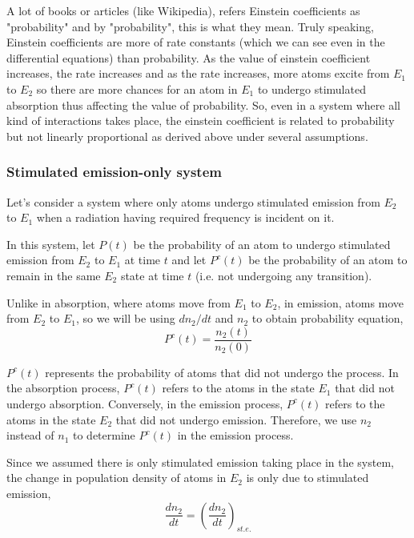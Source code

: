 \documentclass[12pt]{article}
\begin{document}
A lot of books or articles (like Wikipedia), refers Einstein coefficients as "probability" and by "probability", this is what they mean. Truly speaking, Einstein coefficients are more of rate constants (which we can see even in the differential equations) than probability. As the value of einstein coefficient increases, the rate increases and as the rate increases, more atoms excite from $E_{1}$ to $E_{2}$ so there are more chances for an atom in $E_{1}$ to undergo stimulated absorption thus affecting the value of probability. So, even in a system where all kind of interactions takes place, the einstein coefficient is related to probability but not linearly proportional as derived above under several assumptions.

\subsubsection{Stimulated emission-only system}

Let's consider a system where only atoms undergo stimulated emission from $E_{2}$ to $E_{1}$ when a radiation having required frequency is incident on it. \vspace{.2cm}

In this system, let $P(t)$ be the probability of an atom to undergo stimulated emission from $E_{2}$ to $E_{1}$ at time $t$ and let $P^c(t)$ be the probability of an atom to remain in the same $E_{2}$ state at time $t$ (i.e. not undergoing any transition). \vspace{.2cm}

Unlike in absorption, where atoms move from $E_{1}$ to $E_{2}$, in emission, atoms move from $E_{2}$ to $E_{1}$, so we will be using $dn_{2}/dt$ and $n_{2}$ to obtain probability equation,
\begin{equation*}
    P^c(t) = \frac{n_{2}(t)}{n_{2}(0)}
\end{equation*}

$P^c(t)$ represents the probability of atoms that did not undergo the process. In the absorption process, $P^c(t)$ refers to the atoms in the state $E_1$ that did not undergo absorption. Conversely, in the emission process, $P^c(t)$ refers to the atoms in the state $E_2$ that did not undergo emission. Therefore, we use $n_2$ instead of $n_1$ to determine $P^c(t)$ in the emission process. \vspace{.2cm}

Since we assumed there is only stimulated emission taking place in the system, the change in population density of atoms in $E_{2}$ is only due to stimulated emission,
\begin{equation*}
    \frac{dn_{2}}{dt} = (\frac{dn_{2}}{dt})_{st.e.}
\end{equation*} \vspace{.1cm}
\end{document}
